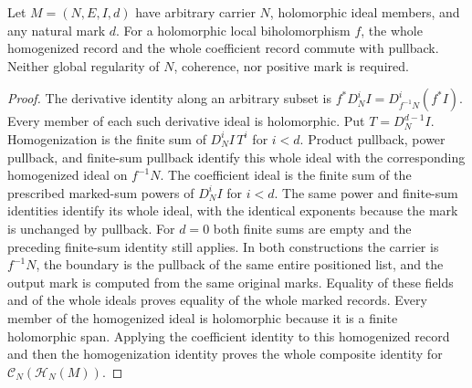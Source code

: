 \begin{theorem}
\label{hir:actual-nonregular-whole-coefficient-naturality}
\leanok
Let $M=(N,E,I,d)$ have arbitrary carrier $N$, holomorphic ideal members,
and any natural mark $d$. For a holomorphic local biholomorphism $f$,
the whole homogenized record and the whole coefficient record commute
with pullback. Neither global regularity of $N$, coherence, nor positive
mark is required.
\end{theorem}
\begin{proof}
The derivative identity along an arbitrary subset is
$f^*D_N^iI=D_{f^{-1}N}^i(f^*I)$. Every member of each such derivative
ideal is holomorphic. Put $T=D_N^{d-1}I$. Homogenization is the finite
sum of $D_N^iI\,T^i$ for $i<d$. Product pullback, power pullback, and
finite-sum pullback identify this whole ideal with the corresponding
homogenized ideal on $f^{-1}N$. The coefficient ideal is the finite sum
of the prescribed marked-sum powers of $D_N^iI$ for $i<d$. The same
power and finite-sum identities identify its whole ideal, with the
identical exponents because the mark is unchanged by pullback. For
$d=0$ both finite sums are empty and the preceding finite-sum identity
still applies. In both constructions the carrier is $f^{-1}N$, the
boundary is the pullback of the same entire positioned list, and the
output mark is computed from the same original marks. Equality of
these fields and of the whole ideals proves equality of the whole
marked records. Every member of the homogenized ideal is holomorphic because it is a finite holomorphic span. Applying the coefficient identity to this homogenized record and then the homogenization identity proves the whole composite identity for $\mathcal C_N(\mathcal H_N(M))$.
\end{proof}
